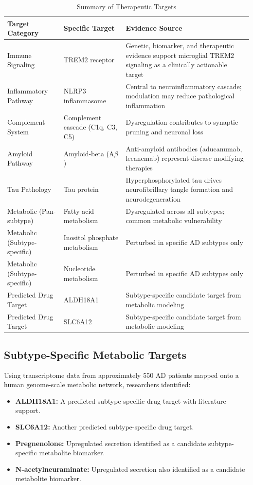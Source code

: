 \documentclass[11pt, a4paper]{article}
\begin{document}
\begin{longtable}{p{3.5cm} p{4.5cm} p{6cm}}
\caption{Summary of Therapeutic Targets}\\
\toprule
\textbf{Target Category} & \textbf{Specific Target} & \textbf{Evidence Source} \\
\midrule
\endfirsthead
\hline
\endfoot
\bottomrule
\endlastfoot
Immune Signaling & TREM2 receptor & Genetic, biomarker, and therapeutic evidence support microglial TREM2 signaling as a clinically actionable target \\
Inflammatory Pathway & NLRP3 inflammasome & Central to neuroinflammatory cascade; modulation may reduce pathological inflammation \\
Complement System & Complement cascade (C1q, C3, C5) & Dysregulation contributes to synaptic pruning and neuronal loss \\
Amyloid Pathway & Amyloid-beta (A$\beta$) & Anti-amyloid antibodies (aducanumab, lecanemab) represent disease-modifying therapies \\
Tau Pathology & Tau protein & Hyperphosphorylated tau drives neurofibrillary tangle formation and neurodegeneration \\
Metabolic (Pan-subtype) & Fatty acid metabolism & Dysregulated across all subtypes; common metabolic vulnerability \\
Metabolic (Subtype-specific) & Inositol phosphate metabolism & Perturbed in specific AD subtypes only \\
Metabolic (Subtype-specific) & Nucleotide metabolism & Perturbed in specific AD subtypes only \\
Predicted Drug Target & ALDH18A1 & Subtype-specific candidate target from metabolic modeling \\
Predicted Drug Target & SLC6A12 & Subtype-specific candidate target from metabolic modeling \\
\hline
\end{longtable}

\subsection{Subtype-Specific Metabolic Targets}
Using transcriptome data from approximately 550 AD patients mapped onto a human genome-scale metabolic network, researchers identified:
\begin{itemize}
    \item \textbf{ALDH18A1:} A predicted subtype-specific drug target with literature support.
    \item \textbf{SLC6A12:} Another predicted subtype-specific drug target.
    \item \textbf{Pregnenolone:} Upregulated secretion identified as a candidate subtype-specific metabolite biomarker.
    \item \textbf{N-acetylneuraminate:} Upregulated secretion also identified as a candidate metabolite biomarker.
\end{itemize}
\end{document}

